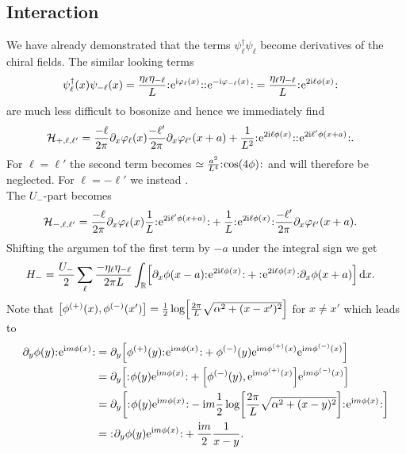 \documentclass[english, parskip=full]{scrartcl}
\begin{document}
\subsection{Interaction}
We have already demonstrated that the terms $\psi_\ell^\dagger\psi_\ell$ become derivatives of the chiral fields.
The similar looking terms
\begin{align}
\psi_\ell^\dagger(x)\psi_{-\ell}(x) &= \frac{\eta_\ell \eta_{-\ell}}{L} {:\mathrel{\mspace{1mu}\text{e}^{\text{i}\varphi_\ell(x)}\mspace{1mu}}:} {:\mathrel{\mspace{1mu}\text{e}^{-\text{i}\varphi_{-\ell}(x)}\mspace{1mu}}:} = \frac{\eta_\ell \eta_{-\ell}}{L} {:\mathrel{\mspace{1mu}\text{e}^{2\text{i}\ell\phi(x)}\mspace{1mu}}:}
\end{align}
are much less difficult to bosonize and hence we immediately find
\begin{align}
\mathcal{H}_{+,\ell,\ell'} &= \frac{-\ell}{2\pi} \partial_x\varphi_\ell(x) \frac{-\ell'}{2\pi} \partial_x\varphi_{\ell'}(x+a) + \frac{1}{L^2} {:\mathrel{\mspace{1mu}\text{e}^{2\text{i}\ell\phi(x)}\mspace{1mu}}:}{:\mathrel{\mspace{1mu}\text{e}^{2\text{i}\ell'\phi(x+a)}\mspace{1mu}}:}.
\end{align}
For $\ell=\ell'$ the second term becomes $\simeq \frac{a^2}{L^4} \normord{\cos\kla*{4\phi}}$ and will therefore be neglected.
For $\ell=-\ell'$ we instead .\\
The $U_-$-part becomes
\begin{align}
\mathcal{H}_{-,\ell,\ell'} &= \frac{-\ell}{2\pi} \partial_x\varphi_\ell(x) \frac{1}{L} {:\mathrel{\mspace{1mu}\text{e}^{2\text{i}\ell'\phi(x+a)}\mspace{1mu}}:} + \frac{1}{L} {:\mathrel{\mspace{1mu}\text{e}^{2\text{i}\ell\phi(x)}\mspace{1mu}}:} \frac{-\ell'}{2\pi} \partial_x\varphi_{\ell'}(x+a).
\end{align}
Shifting the argumen tof the first term by $-a$ under the integral sign we get
\begin{align}
H_- &= \frac{U_-}{2} \sum_\ell \frac{ -\eta_\ell \eta_{-\ell}}{2\pi L} \intr{ \klb*{\partial_x\phi(x-a) \normord{\powe{2\i\ell\phi(x)}} +  \normord{\powe{2\i\ell\phi(x)}}\partial_x\phi(x+a)} }{x}.
\end{align}
Note that $\klb*{\phi^{(+)}(x), \phi^{(-)}(x')} = \frac{1}{2} \log\klb*{\frac{2\pi}{L} \sqrt{\alpha^2 + (x-x')^2}}$ for $x\neq x'$ which leads to
\begin{align}
\partial_y \phi(y) \normord{\powe{\i m\phi(x)}} &= \partial_y \klb*{\phi^{(+)}(y) \normord{\powe{\i m\phi(x)}} + \phi^{(-)}(y) \powe{\i m\phi^{(+)}(x)} \powe{\i m\phi^{(-)}(x)}}\\
&= \partial_y \klb*{\normord{\phi(y) \powe{\i m\phi(x)}} + \klb*{\phi^{(-)}(y), \powe{\i m\phi^{(+)}(x)}} \powe{\i m\phi^{(-)}(x)}}\\
&= \partial_y \klb*{\normord{\phi(y) \powe{\i m\phi(x)}} -\i m \frac{1}{2} \log\klb*{\frac{2\pi}{L} \sqrt{\alpha^2 + (x-y)^2}} \normord{\powe{\i m\phi(x)}}}\\
&= \normord{\partial_y\phi(y) \powe{\i m\phi(x)}} + \frac{\i m}{2} \frac{1}{x-y}.
\end{align}
\end{document}
